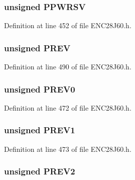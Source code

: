 \subsubsection[{P\+P\+W\+R\+S\+V}]{\setlength{\rightskip}{0pt plus 5cm}unsigned P\+P\+W\+R\+S\+V}\label{union_p_h_y_r_e_g_ae7c15f2966e7ea51ac4c408049bb6f78}


Definition at line 452 of file E\+N\+C28\+J60.\+h.

\hypertarget{union_p_h_y_r_e_g_aecceede39a1051e4b57150f31bf8601d}{}
\subsubsection[{P\+R\+E\+V}]{\setlength{\rightskip}{0pt plus 5cm}unsigned P\+R\+E\+V}\label{union_p_h_y_r_e_g_aecceede39a1051e4b57150f31bf8601d}


Definition at line 490 of file E\+N\+C28\+J60.\+h.

\hypertarget{union_p_h_y_r_e_g_a63d45776d3400cc0aecb15969d0af160}{}
\subsubsection[{P\+R\+E\+V0}]{\setlength{\rightskip}{0pt plus 5cm}unsigned P\+R\+E\+V0}\label{union_p_h_y_r_e_g_a63d45776d3400cc0aecb15969d0af160}


Definition at line 472 of file E\+N\+C28\+J60.\+h.

\hypertarget{union_p_h_y_r_e_g_a0f924360966835a628bde890ff5aadf6}{}
\subsubsection[{P\+R\+E\+V1}]{\setlength{\rightskip}{0pt plus 5cm}unsigned P\+R\+E\+V1}\label{union_p_h_y_r_e_g_a0f924360966835a628bde890ff5aadf6}


Definition at line 473 of file E\+N\+C28\+J60.\+h.

\hypertarget{union_p_h_y_r_e_g_abadbd0e50f14ec79acba745e51c13f9e}{}
\subsubsection[{P\+R\+E\+V2}]{\setlength{\rightskip}{0pt plus 5cm}unsigned P\+R\+E\+V2}\label{union_p_h_y_r_e_g_abadbd0e50f14ec79acba745e51c13f9e}


